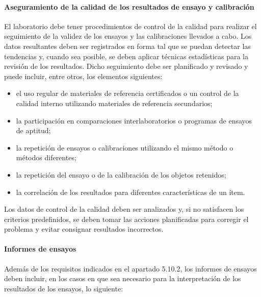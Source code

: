 \paragraph{Aseguramiento de la calidad de los resultados de ensayo y calibración}
\par 
El laboratorio debe tener procedimientos de control de la calidad para realizar el seguimiento de la
validez de los ensayos y las calibraciones llevados a cabo. Los datos resultantes deben ser registrados en
forma tal que se puedan detectar las tendencias y, cuando sea posible, se deben aplicar técnicas estadísticas
para la revisión de los resultados. Dicho seguimiento debe ser planificado y revisado y puede incluir, entre
otros, los elementos siguientes:

\begin{itemize}
\item el uso regular de materiales de referencia certificados o un control de la calidad interno utilizando
materiales de referencia secundarios;

\item la participación en comparaciones interlaboratorios o programas de ensayos de aptitud;

\item la repetición de ensayos o calibraciones utilizando el mismo método o métodos diferentes;

\item la repetición del ensayo o de la calibración de los objetos retenidos;

\item la correlación de los resultados para diferentes características de un ítem.
\end{itemize}

\par \noindent
Los datos de control de la calidad deben ser analizados y, si no satisfacen los criterios predefinidos,
se deben tomar las acciones planificadas para corregir el problema y evitar consignar resultados incorrectos.

\paragraph{Informes de ensayos}
\par 
Además de los requisitos indicados en el apartado 5.10.2, los informes de ensayos deben incluir,
en los casos en que sea necesario para la interpretación de los resultados de los ensayos, lo siguiente:

